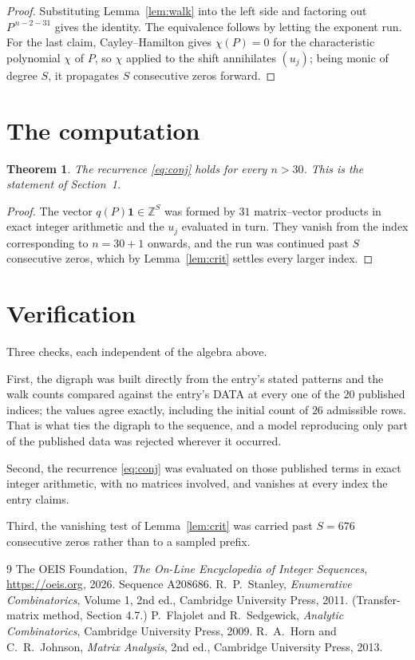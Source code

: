\documentclass[11pt,a4paper]{article}
\theoremstyle{plain}
\newtheorem{theorem}{Theorem}
\theoremstyle{definition}
\begin{document}
\begin{proof}
Substituting Lemma~\ref{lem:walk} into the left side and factoring out
$P^{\,n-2-31}$ gives the identity. The equivalence follows by letting the exponent
run. For the last claim, Cayley--Hamilton gives $\chi(P)=0$ for the characteristic
polynomial $\chi$ of $P$, so $\chi$ applied to the shift annihilates $(u_j)$; being monic of
degree $S$, it propagates $S$ consecutive zeros forward.
\end{proof}

\section{The computation}

\begin{theorem}
The recurrence \eqref{eq:conj} holds for every $n>30$. This is the statement of
Section~1.
\end{theorem}

\begin{proof}
The vector $q(P)\mathbf{1}\in\mathbb{Z}^{S}$ was formed by $31$ matrix--vector
products in exact integer arithmetic and the $u_j$ evaluated in turn. They vanish from the
index corresponding to $n=30+1$ onwards, and the run was continued past $S$ consecutive
zeros, which by Lemma~\ref{lem:crit} settles every larger index.
\end{proof}

\section{Verification}

Three checks, each independent of the algebra above.

First, the digraph was built directly from the entry's stated patterns and the walk counts
compared against the entry's DATA at every one of the $20$ published indices; the
values agree exactly, including the initial count of $26$ admissible rows. That is
what ties the digraph to the sequence, and a model reproducing only part of the published
data was rejected wherever it occurred.

Second, the recurrence \eqref{eq:conj} was evaluated on those published terms in exact
integer arithmetic, with no matrices involved, and vanishes at every index the entry claims.

Third, the vanishing test of Lemma~\ref{lem:crit} was carried past $S=676$ consecutive
zeros rather than to a sampled prefix.

\begin{thebibliography}{9}
 The OEIS Foundation, \emph{The On-Line Encyclopedia of Integer
Sequences}, \url{https://oeis.org}, 2026. Sequence A208686.
 R.~P.~Stanley, \emph{Enumerative Combinatorics}, Volume 1, 2nd ed.,
Cambridge University Press, 2011. (Transfer-matrix method, Section 4.7.)
 P.~Flajolet and R.~Sedgewick, \emph{Analytic Combinatorics}, Cambridge
University Press, 2009.
 R.~A.~Horn and C.~R.~Johnson, \emph{Matrix Analysis}, 2nd ed., Cambridge
University Press, 2013.
\end{thebibliography}
\end{document}
